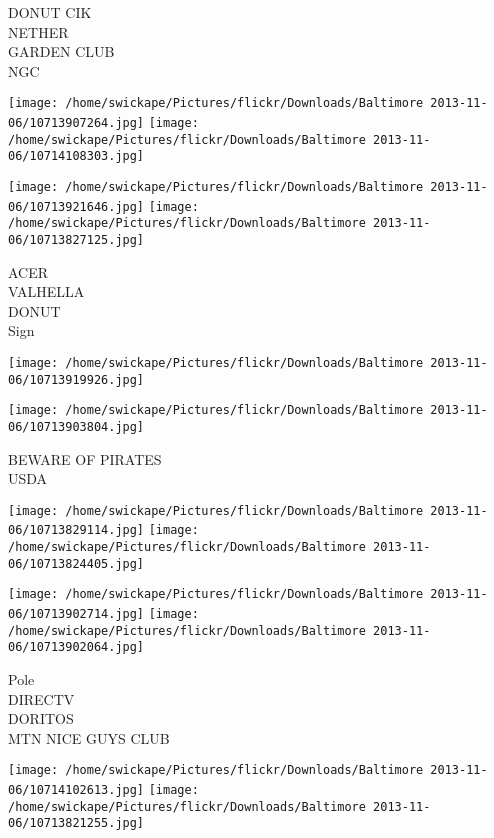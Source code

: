 \documentclass[10pt,letterpaper]{article}
\begin{document}
DONUT CIK\\
NETHER\\
GARDEN CLUB\\
NGC\\
\pagebreak

\texttt{[image: /home/swickape/Pictures/flickr/Downloads/Baltimore 2013-11-06/10713907264.jpg]}
\texttt{[image: /home/swickape/Pictures/flickr/Downloads/Baltimore 2013-11-06/10714108303.jpg]}

\texttt{[image: /home/swickape/Pictures/flickr/Downloads/Baltimore 2013-11-06/10713921646.jpg]}
\texttt{[image: /home/swickape/Pictures/flickr/Downloads/Baltimore 2013-11-06/10713827125.jpg]}

ACER\\
VALHELLA\\
DONUT\\
Sign\\
\pagebreak

\texttt{[image: /home/swickape/Pictures/flickr/Downloads/Baltimore 2013-11-06/10713919926.jpg]}

\vspace{0.25in}
\texttt{[image: /home/swickape/Pictures/flickr/Downloads/Baltimore 2013-11-06/10713903804.jpg]}

BEWARE OF PIRATES\\
USDA\\
\pagebreak

\texttt{[image: /home/swickape/Pictures/flickr/Downloads/Baltimore 2013-11-06/10713829114.jpg]}
\texttt{[image: /home/swickape/Pictures/flickr/Downloads/Baltimore 2013-11-06/10713824405.jpg]}

\texttt{[image: /home/swickape/Pictures/flickr/Downloads/Baltimore 2013-11-06/10713902714.jpg]}
\texttt{[image: /home/swickape/Pictures/flickr/Downloads/Baltimore 2013-11-06/10713902064.jpg]}

Pole\\
DIRECTV\\
DORITOS\\
MTN NICE GUYS CLUB\\
\pagebreak

\texttt{[image: /home/swickape/Pictures/flickr/Downloads/Baltimore 2013-11-06/10714102613.jpg]}
\texttt{[image: /home/swickape/Pictures/flickr/Downloads/Baltimore 2013-11-06/10713821255.jpg]}
\end{document}
